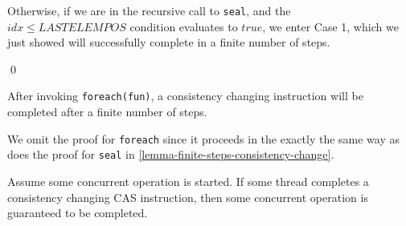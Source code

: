 \begin{prooftwo}
\begin{itemize}



Otherwise, if we are in the recursive call to \verb=seal=, and the $idx \leq LASTELEMPOS$
condition evaluates to $true$, we enter Case 1, which we just
showed will successfully complete in a finite number of steps.

\end{itemize}
\qed
\end{prooftwo}


\begin{lemmatwo}[Foreach]\label{lemma-foreach-cons}
After invoking \verb=foreach(fun)=, a consistency changing instruction will
be completed after a finite number of steps.
\end{lemmatwo}

We omit the proof for \verb=foreach= since it proceeds in the exactly the same way
as does the proof for \verb=seal= in
\ref{lemma-finite-steps-consistency-change}.


\begin{lemmatwo}\label{lemma-operation-completes}
Assume some concurrent operation is started. If some thread completes
a consistency changing CAS instruction, then some concurrent operation is
guaranteed to be completed.
\end{lemmatwo}

